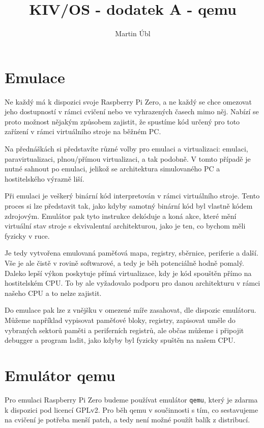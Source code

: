 \documentclass{article}
\author{Martin Úbl}
\title{KIV/OS - dodatek A - qemu}
\begin{document}
\maketitle


\section{Emulace}

Ne každý má k dispozici svoje Raspberry Pi Zero, a ne každý se chce omezovat jeho dostupností v rámci cvičení nebo ve vyhrazených časech mimo něj. Nabízí se proto možnost nějakým způsobem zajistit, že spustíme kód určený pro toto zařízení v rámci virtuálního stroje na běžném PC.

Na přednáškách si představíte různé volby pro emulaci a virtualizaci: emulaci, paravirtualizaci, plnou/přímou virtualizaci, a tak podobně. V tomto případě je nutné sahnout po emulaci, jelikož se architektura simulovaného PC a hostitelského výrazně liší.

Při emulaci je veškerý binární kód interpretován v rámci virtuálního stroje. Tento proces si lze představit tak, jako kdyby samotný binární kód byl vlastně kódem zdrojovým. Emulátor pak tyto instrukce dekóduje a koná akce, které mění virtuální stav stroje s ekvivalentní architekturou, jako je ten, co bychom měli fyzicky v ruce.

Je tedy vytvořena emulovaná paměťová mapa, registry, sběrnice, periferie a další. Vše je ale čistě v rovině softwarové, a tedy je běh potenciálně hodně pomalý. Daleko lepší výkon poskytuje přímá virtualizace, kdy je kód spouštěn přímo na hostitelském CPU. To by ale vyžadovalo podporu pro danou architekturu v rámci našeho CPU a to nelze zajistit.

Do emulace pak lze z vnějšku v omezené míře zasahovat, dle dispozic emulátoru. Můžeme například vypisovat paměťové bloky, registry, zapisovat uměle do vybraných sektorů paměti a periferních registrů, ale občas můžeme i připojit debugger a program ladit, jako kdyby byl fyzicky spuštěn na našem CPU.

\section{Emulátor qemu}

Pro emulaci Raspberry Pi Zero budeme používat emulátor {\tt qemu}, který je zdarma k dispozici pod licencí GPLv2. Pro běh qemu v součinnosti s tím, co sestavujeme na cvičení je potřeba menší patch, a tedy není možné  použít balík z distribucí.
\end{document}
